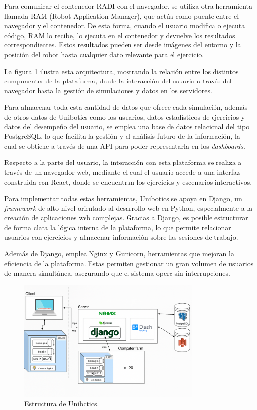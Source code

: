 \documentclass[a4paper, 12pt]{book}
\begin{document}
Para comunicar el contenedor RADI con el navegador, se utiliza otra herramienta llamada RAM (Robot Application Manager), que actúa como puente entre el navegador y el contenedor. De esta forma, cuando el usuario modifica o ejecuta código, RAM lo recibe, lo ejecuta en el contenedor y devuelve los resultados correspondientes. Estos resultados pueden ser desde imágenes del entorno y la posición del robot hasta cualquier dato relevante para el ejercicio.

La figura \ref{fig:arquitectura} ilustra esta arquitectura, mostrando la relación entre los distintos componentes de la plataforma, desde la interacción del usuario a través del navegador hasta la gestión de simulaciones y datos en los servidores.

Para almacenar toda esta cantidad de datos que ofrece cada simulación, además de otros datos de Unibotics como los usuarios, datos estadísticos de ejercicios y datos del desempeño del usuario, se emplea una base de datos relacional del tipo PostgreSQL, lo que facilita la gestión y el análisis futuro de la información, la cual se obtiene a través de una API para poder representarla en los \textit{dashboards}.

Respecto a la parte del usuario, la interacción con esta plataforma se realiza a través de un navegador web, mediante el cual el usuario accede a una interfaz construida con React, donde se encuentran los ejercicios y escenarios interactivos.

Para implementar todas estas herramientas, Unibotics se apoya en Django, un \textit{framework} de alto nivel orientado al desarrollo web en Python, especialmente a la creación de aplicaciones web complejas. Gracias a Django, es posible estructurar de forma clara la lógica interna de la plataforma, lo que permite relacionar usuarios con ejercicios y almacenar información sobre las sesiones de trabajo.

Además de Django, emplea Nginx y Gunicorn, herramientas que mejoran la eficiencia de la plataforma. Estas permiten gestionar un gran volumen de usuarios de manera simultánea, asegurando que el sistema opere sin interrupciones.

\begin{figure}
  \centering
  \includegraphics[width=0.8\textwidth, keepaspectratio]{img/arquitectura.png}
  \caption{Estructura de Unibotics.}
  \label{fig:arquitectura}
\end{figure}
\end{document}
